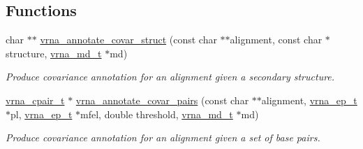 \subsection*{Functions}
\begin{DoxyCompactItemize}
\item 
\mbox{\label{group__annotation__utils_gae0305bbf95eddd4a57648a1e4739a7f3}} 
char $\ast$$\ast$ \hyperlink{group__annotation__utils_gae0305bbf95eddd4a57648a1e4739a7f3}{vrna\+\_\+annotate\+\_\+covar\+\_\+struct} (const char $\ast$$\ast$alignment, const char $\ast$structure, \hyperlink{group__model__details_ga1f8a10e12a0a1915f2a4eff0b28ea17c}{vrna\+\_\+md\+\_\+t} $\ast$md)
\begin{DoxyCompactList}\small\item\em Produce covariance annotation for an alignment given a secondary structure. \end{DoxyCompactList}\item 
\mbox{\label{group__annotation__utils_gadb9ba32197f05d5876d389b2ba92edac}} 
\hyperlink{group__data__structures_gae4fc91141cc69c6d8eaf1332cb991ecc}{vrna\+\_\+cpair\+\_\+t} $\ast$ \hyperlink{group__annotation__utils_gadb9ba32197f05d5876d389b2ba92edac}{vrna\+\_\+annotate\+\_\+covar\+\_\+pairs} (const char $\ast$$\ast$alignment, \hyperlink{group__struct__utils_gab9ac98ab55ded9fb90043b024b915aca}{vrna\+\_\+ep\+\_\+t} $\ast$pl, \hyperlink{group__struct__utils_gab9ac98ab55ded9fb90043b024b915aca}{vrna\+\_\+ep\+\_\+t} $\ast$mfel, double threshold, \hyperlink{group__model__details_ga1f8a10e12a0a1915f2a4eff0b28ea17c}{vrna\+\_\+md\+\_\+t} $\ast$md)
\begin{DoxyCompactList}\small\item\em Produce covariance annotation for an alignment given a set of base pairs. \end{DoxyCompactList}\end{DoxyCompactItemize}
